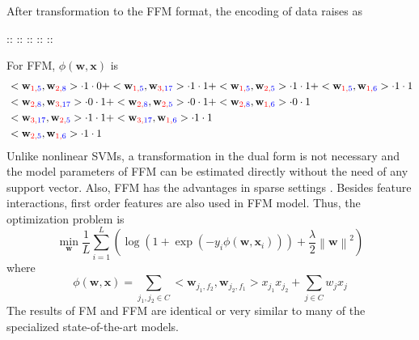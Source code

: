 After transformation to the FFM format, the encoding of data raises as 
\begin{center}
\color{red}{1}:\color{blue}{5}:\color{black}{1}	\color{red}{2}:\color{blue}{8}:\color{black}{0}	\color{red}{3}:\color{blue}{17}:\color{black}{1}	\color{red}{2}:\color{blue}{5}:\color{black}{1}	\color{red}{1}:\color{blue}{6}:\color{black}{1}
\end{center}
For FFM, $\phi (\mathbf{w},\mathbf{x})$ is
\begin{equation}
\begin{split}
& <\mathbf{w}_{\color{red}{1},\color{blue}{5}}, \mathbf{w}_{\color{red}{2},\color{blue}{8}}> \cdot {1} \cdot 0 + <\mathbf{w}_{\color{red}{1},\color{blue}{5}}, \mathbf{w}_{\color{red}{3},\color{blue}{17}}> \cdot 1 \cdot 1 + <\mathbf{w}_{\color{red}{1},\color{blue}{5}}, \mathbf{w}_{\color{red}{2},\color{blue}{5}}> \cdot 1 \cdot 1 + <\mathbf{w}_{\color{red}{1},\color{blue}{5}}, \mathbf{w}_{\color{red}{1},\color{blue}{6}}> \cdot 1 \cdot 1 \\
& <\mathbf{w}_{\color{red}{2},\color{blue}{8}}, \mathbf{w}_{\color{red}{3},\color{blue}{17}}> \cdot 0 \cdot 1 + <\mathbf{w}_{\color{red}{2},\color{blue}{8}}, \mathbf{w}_{\color{red}{2},\color{blue}{5}}> \cdot 0 \cdot 1 + <\mathbf{w}_{\color{red}{2},\color{blue}{8}}, \mathbf{w}_{\color{red}{1},\color{blue}{6}}> \cdot 0 \cdot 1 \\
& <\mathbf{w}_{\color{red}{3},\color{blue}{17}}, \mathbf{w}_{\color{red}{2},\color{blue}{5}}> \cdot 1 \cdot 1 + <\mathbf{w}_{\color{red}{3},\color{blue}{17}}, \mathbf{w}_{\color{red}{1},\color{blue}{6}}> \cdot 1 \cdot 1 \\
& <\mathbf{w}_{\color{red}{2},\color{blue}{5}}, \mathbf{w}_{\color{red}{1},\color{blue}{6}}> \cdot 1 \cdot 1
\end{split}
\end{equation}
Unlike nonlinear SVMs, a transformation in the dual form is not necessary and the model parameters of FFM can be estimated directly without the need of any support vector. Also, FFM has the advantages in sparse settings \cite{steffenrendle2010}. Besides feature interactions, first order features are also used in FFM model. Thus, the optimization problem is
\begin{equation}
\underset{\mathbf{w}}{\min}\frac{1}{L} \sum_{i=1}^{L}(\log (1+\exp (-y_i \phi (\mathbf{w}, \mathbf{x}_i)))+\frac{\lambda}{2}\left \| \mathbf{w} \right \|^{2})
\end{equation}
where 
\begin{equation}
\phi (\mathbf{w},\mathbf{x})=\sum_{j_1,j_2 \in C}<\mathbf{w}_{j_1,f_2},\mathbf{w}_{j_2,f_1}>x_{j_1}x_{j_2}+\sum_{j \in C}w_{j}x_{j}
\end{equation}
The results of FM and FFM are identical or very similar to many of the specialized state-of-the-art models.










